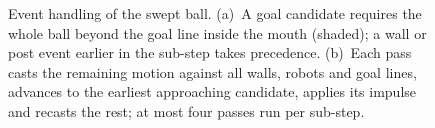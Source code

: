 \begin{figure}[htbp]
{}
    \caption{Event handling of the swept ball.  (a)~A goal candidate requires the
    whole ball beyond the goal line inside the mouth (shaded); a wall or post event
    earlier in the sub-step takes precedence.  (b)~Each pass casts the remaining
    motion against all walls, robots and goal lines, advances to the earliest
    approaching candidate, applies its impulse and recasts the rest; at most four
    passes run per sub-step.}
    \label{fig:events}
\end{figure}
